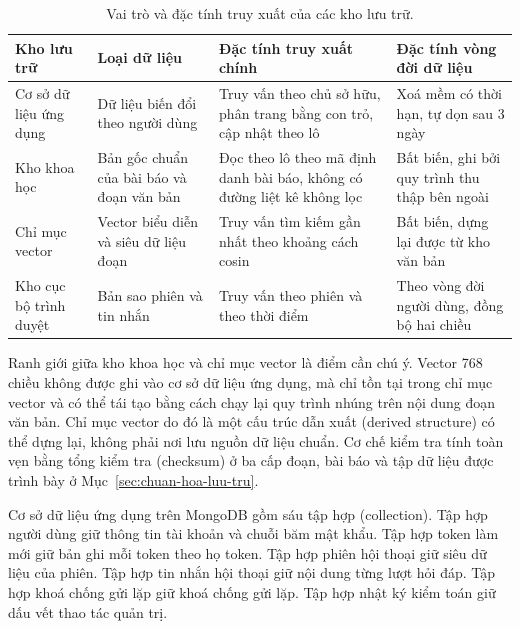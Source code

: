 \begin{table}[H]
    \centering
    \caption{Vai trò và đặc tính truy xuất của các kho lưu trữ.}
    \label{tab:vai-tro-kho-luu-tru}
    \small
    \begin{tabularx}{\textwidth}{@{}>{\raggedright\arraybackslash}p{2.7cm}>{\raggedright\arraybackslash}p{3.2cm}>{\raggedright\arraybackslash}p{4.4cm}>{\raggedright\arraybackslash}X@{}}
        \toprule
        \textbf{Kho lưu trữ} & \textbf{Loại dữ liệu} & \textbf{Đặc tính truy xuất chính} & \textbf{Đặc tính vòng đời dữ liệu} \\
        \midrule
        Cơ sở dữ liệu ứng dụng & Dữ liệu biến đổi theo người dùng & Truy vấn theo chủ sở hữu, phân trang bằng con trỏ, cập nhật theo lô & Xoá mềm có thời hạn, tự dọn sau 3 ngày \\
        Kho khoa học & Bản gốc chuẩn của bài báo và đoạn văn bản & Đọc theo lô theo mã định danh bài báo, không có đường liệt kê không lọc & Bất biến, ghi bởi quy trình thu thập bên ngoài \\
        Chỉ mục vector & Vector biểu diễn và siêu dữ liệu đoạn & Truy vấn tìm kiếm gần nhất theo khoảng cách cosin & Bất biến, dựng lại được từ kho văn bản \\
        Kho cục bộ trình duyệt & Bản sao phiên và tin nhắn & Truy vấn theo phiên và theo thời điểm & Theo vòng đời người dùng, đồng bộ hai chiều \\
        \bottomrule
    \end{tabularx}
\end{table}

Ranh giới giữa kho khoa học và chỉ mục vector là điểm cần chú ý. Vector 768 chiều không được ghi vào cơ sở dữ liệu ứng dụng, mà chỉ tồn tại trong chỉ mục vector và có thể tái tạo bằng cách chạy lại quy trình nhúng trên nội dung đoạn văn bản. Chỉ mục vector do đó là một cấu trúc dẫn xuất (derived structure) có thể dựng lại, không phải nơi lưu nguồn dữ liệu chuẩn. Cơ chế kiểm tra tính toàn vẹn bằng tổng kiểm tra (checksum) ở ba cấp đoạn, bài báo và tập dữ liệu được trình bày ở Mục~\ref{sec:chuan-hoa-luu-tru}.

Cơ sở dữ liệu ứng dụng trên MongoDB gồm sáu tập hợp (collection). Tập hợp người dùng giữ thông tin tài khoản và chuỗi băm mật khẩu. Tập hợp token làm mới giữ bản ghi mỗi token theo họ token. Tập hợp phiên hội thoại giữ siêu dữ liệu của phiên. Tập hợp tin nhắn hội thoại giữ nội dung từng lượt hỏi đáp. Tập hợp khoá chống gửi lặp giữ khoá chống gửi lặp. Tập hợp nhật ký kiểm toán giữ dấu vết thao tác quản trị.

